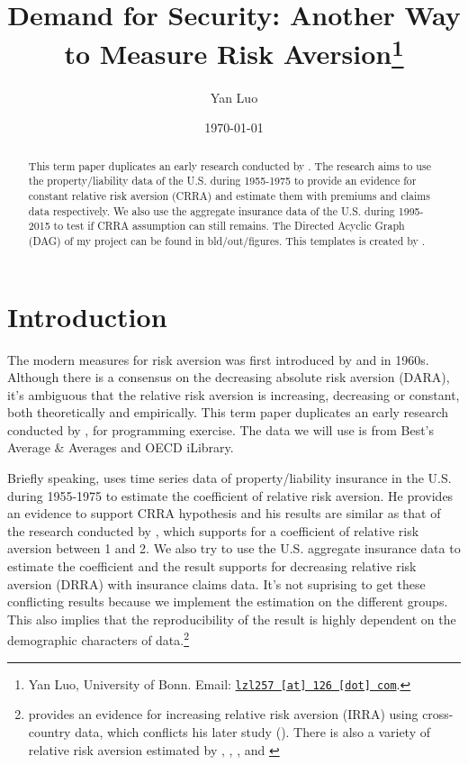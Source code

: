 \documentclass[11pt, a4paper, leqno]{article}
\begin{document}
\title{Demand for Security: Another Way to Measure Risk Aversion\thanks{Yan Luo, University of Bonn. Email: \href{mailto:lzl257@126.com}{\nolinkurl{lzl257 [at] 126 [dot] com}}.}}

\author{Yan Luo}

\date{
\today
}

\maketitle


\begin{abstract}
	This term paper duplicates an early research conducted by \citet{szpiro1986measuring}. The research aims to use the property/liability data of the U.S. during 1955-1975 to provide an evidence for constant relative risk aversion (CRRA) and estimate them with premiums and claims data respectively. We also use the aggregate insurance data of the U.S. during 1995-2015 to test if CRRA assumption can still remains. The Directed Acyclic Graph (DAG) of my project can be found in bld/out/figures. This templates is created by \citet{GaudeckerEconProjectTemplates}.
\end{abstract}
\clearpage

\section{Introduction} %
\label{sec:introduction}

The modern measures for risk aversion was first introduced by \citet{arrow1965aspects} and \citet{pratt1978risk} in 1960s. Although there is a consensus on the decreasing absolute risk aversion (DARA), it's ambiguous that the relative risk aversion is increasing, decreasing or constant, both theoretically and empirically. This term paper duplicates an early research conducted by \citet{szpiro1986measuring}, for programming exercise. The data we will use is from Best's Average \& Averages and OECD iLibrary.

Briefly speaking, \citet{szpiro1986measuring} uses time series data of property/liability insurance in the U.S. during 1955-1975 to estimate the coefficient of relative risk aversion. He provides an evidence to support CRRA hypothesis and his results are similar as that of the research conducted by \citet{friend1975demand}, which supports for a coefficient of relative risk aversion between 1 and 2. We also try to use the U.S. aggregate insurance data to estimate the coefficient and the result supports for decreasing relative risk aversion (DRRA) with insurance claims data. It's not suprising to get these conflicting results because we implement the estimation on the different groups. This also implies that the reproducibility of the result is highly dependent on the demographic characters of data.\footnote{\citet{szpiro1983hypotheses} provides an evidence for increasing relative risk aversion (IRRA) using cross-country data, which conflicts his later study (\citet{szpiro1986measuring}). There is also a variety of relative risk aversion estimated by \citet{cohn1975individual}, \citet{siegel1982relative}, \citet{hansen1982generalized}, \citet{morin1983risk} and \citet{eisenhauer1999prudence}}
\end{document}
